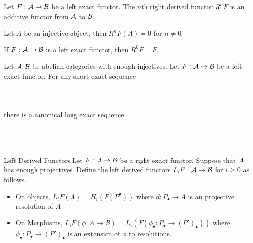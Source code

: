 \documentclass[a4paper]{article}
\begin{document}
\begin{prp}{}{} Let $F:\mathcal{A}\to\mathcal{B}$ be a left exact functor. The $n$th right derived functor $R^nF$ is an additive functor from $\mathcal{A}$ to $\mathcal{B}$. 
\end{prp}

\begin{lmm}{}{} Let $A$ be an injective object, then $R^nF(A)=0$ for $n\neq 0$. 
\end{lmm}

\begin{crl}{}{} If $F:\mathcal{A}\to\mathcal{B}$ is a left exact functor, then $R^0F=F$. 
\end{crl}

\begin{thm}{}{} Let $\mathcal{A},\mathcal{B}$ be abelian categories with enough injectives. Let $F:\mathcal{A}\to\mathcal{B}$ be a left exact functor. For any short exact sequence \\~\\
\\~\\
there is a canonical long exact sequence \\~\\
\\~\\
\end{thm}

\begin{defn}{Left Derived Functors}{} Let $F:\mathcal{A}\to\mathcal{B}$ be a right exact functor. Suppose that $\mathcal{A}$ has enough projectives. Define the left derived functors $L_iF:\mathcal{A}\to\mathcal{B}$ for $i\geq 0$ as follows. 
\begin{itemize}
\item On objects, $L_iF(A)=H_i(F(P^\bullet))$ where $d:P_\bullet\to A$ is an projective resolution of $A$
\item On Morphisms, $L_iF(\phi:A\to B)=L_i(F(\phi_\bullet:P_\bullet\to (P')_\bullet))$ where $\phi_\bullet:P_\bullet\to(P')_\bullet$ is an extension of $\phi$ to resolutions. 
\end{itemize}
\end{defn}
\end{document}
